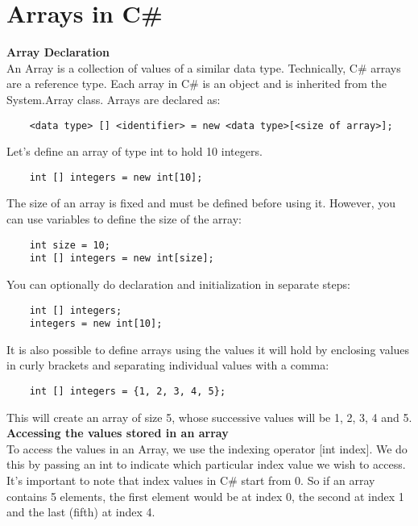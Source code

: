 \section{Arrays in C\#}

\textbf{Array Declaration}\\

An Array is a collection of values of a similar data type. Technically, C\# arrays are a reference type. Each array in
C\# is an object and is inherited from the System.Array class. Arrays are declared as:

\begin{lstlisting}
    <data type> [] <identifier> = new <data type>[<size of array>];    
\end{lstlisting}

Let's define an array of type int to hold 10 integers.

\begin{lstlisting}
    int [] integers = new int[10];    
\end{lstlisting}

The size of an array is fixed and must be defined before using it. However, you can use variables to define the size
of the array:

\begin{lstlisting}
    int size = 10;
    int [] integers = new int[size];        
\end{lstlisting}

You can optionally do declaration and initialization in separate steps:

\begin{lstlisting}
    int [] integers;
    integers = new int[10];        
\end{lstlisting}

It is also possible to define arrays using the values it will hold by enclosing values in curly brackets and separating
individual values with a comma:

\begin{lstlisting}
    int [] integers = {1, 2, 3, 4, 5};    
\end{lstlisting}

This will create an array of size 5, whose successive values will be 1, 2, 3, 4 and 5.\\

\textbf{Accessing the values stored in an array}\\

To access the values in an Array, we use the indexing operator [int index]. We do this by passing an int to indicate
which particular index value we wish to access. It’s important to note that index values in C\# start from 0. So if an
array contains 5 elements, the first element would be at index 0, the second at index 1 and the last (fifth) at index 4.

